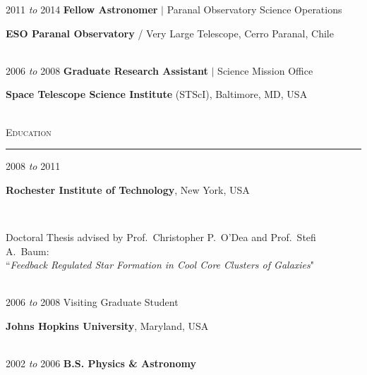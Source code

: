 \documentclass[11pt]{article}
\makeatletter
\def\vhrulefill#1{\leavevmode\leaders\hrule\@height#1\hfill \kern\z@}
\makeatother
\begin{document}
\hspace{2.5mm} 2011 \textit{to} 2014 \hspace{17mm} \textbf{Fellow Astronomer} $|$ Paranal Observatory Science Operations

\hspace{42mm} \parbox{5.15in}{\textbf{ESO Paranal Observatory} / Very Large Telescope, Cerro Paranal, Chile} \\



\hspace{2.5mm} 2006 \textit{to} 2008 \hspace{17mm} \textbf{Graduate Research Assistant} $|$ Science Mission Office

\hspace{42mm} \parbox{5.15in}{\textbf{Space Telescope Science Institute} (STScI), Baltimore, MD, USA} \\



\textsc{Education} \vhrulefill{0.4pt}

\vspace{2mm}


\hspace{2.5mm}2008 \textit{to} 2011 

\hspace{42mm}\parbox{5.15in}{\textbf{Rochester Institute of Technology}, New York, USA} \\



\hspace{42mm} \parbox{5.15in}{Doctoral Thesis advised by Prof.~Christopher P.~O'Dea and Prof.~Stefi A.~Baum: \\ ``\textit{Feedback Regulated Star Formation in Cool Core Clusters of Galaxies}"} \\




\hspace{2.5mm}2006 \textit{to} 2008  \hspace{18mm} Visiting Graduate Student

\hspace{42mm} \parbox{5.15in}{\textbf{Johns Hopkins University}, Maryland, USA} \\



\hspace{2.5mm} 2002 \textit{to} 2006 \hspace{17mm} {\textbf{B.S. Physics \& Astronomy}}
\end{document}
